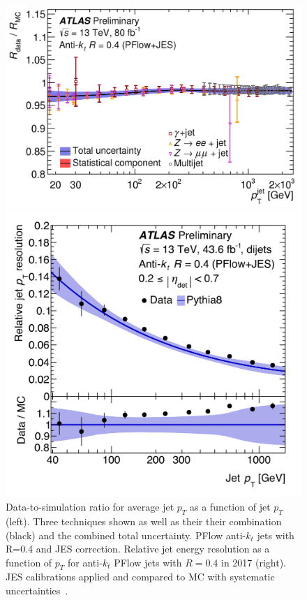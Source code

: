 \begin{figure}[!h]
    \centering
  \begin{minipage}[b]{0.5\textwidth}
  \includegraphics[width=\textwidth]{Pictures/ParticleFlowScale.png}
  \end{minipage}
  \hspace{.5cm}
  \begin{minipage}[b]{0.4\textwidth}
    \includegraphics[width=\textwidth]{Pictures/ParticleFlowResolution.png}
  \end{minipage}
    \caption{ Data-to-simulation ratio for average jet $p_T$ as a function of jet $p_T$ (left). Three techniques shown as well as their their combination (black) and the combined total uncertainty. PFlow anti-$k_t$ jets with R=0.4 and JES correction. Relative jet energy resolution as a function of $p_T$ for anti-$k_t$ PFlow jets with $R=0.4$ in 2017 (right). JES calibrations applied and compared to MC with systematic uncertainties~\cite{JETEtmiss}.}
    \label{fig:ScaleRes}
\end{figure}

